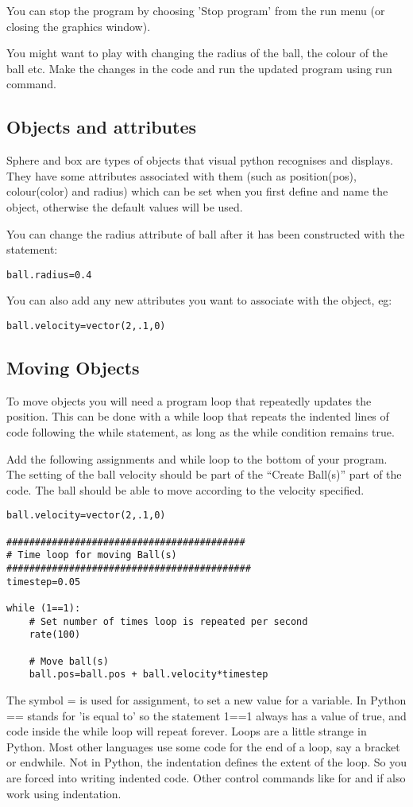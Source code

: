 \documentclass[12pt]{article}
\begin{document}
You can stop the program by choosing 'Stop program' from the run menu (or closing the graphics window).

You might want to play with changing the radius of the ball, the colour of the ball etc. Make the changes in the code and run the updated program using run command.

\subsection{Objects and attributes}
Sphere and box are types of objects that visual python recognises and displays.
They have some attributes associated with them (such as
position({\color{code}pos}), colour({\color{code}color}) and
{\color{code}radius}) which can be set when you first define and name the object,
otherwise the default values will be used.

You can change the radius attribute of {\color{code}ball} after it has been constructed
with the statement:
{\color{code}\begin{verbatim}
ball.radius=0.4
\end{verbatim}}
You can also add any new attributes you want to associate with the object, eg:
{\color{code}\begin{verbatim}
ball.velocity=vector(2,.1,0)
\end{verbatim}}

\subsection{Moving Objects}
To move objects you will need a program loop that repeatedly updates the position.
This can be done with a while loop that repeats the indented lines of code following
the while statement, as long as the while condition remains true.

Add the following assignments and while loop to the bottom of your program. The setting of the ball velocity should be part of the ``Create Ball(s)'' part of the code.  The ball should be able to move according to the velocity specified.
{\color{code}\begin{verbatim}
ball.velocity=vector(2,.1,0)

##########################################
# Time loop for moving Ball(s)
###########################################
timestep=0.05

while (1==1):
    # Set number of times loop is repeated per second
    rate(100)

    # Move ball(s)
    ball.pos=ball.pos + ball.velocity*timestep
\end{verbatim}
}
The symbol {\small\color{code}=} is used for assignment, to set a new value for a variable.
In Python {\small\color{code}==} stands for 'is equal to'
so the statement {\small\color{code}1==1} always has a value of true,
and code inside the while loop will repeat forever.
Loops are a little strange in Python. Most other languages use some
code for the end of a loop, say a bracket or {\small\color{code}endwhile}.
Not in Python, the indentation defines the extent of the loop. So you are
forced into writing indented code. Other control commands like {\small\color{code}for}
and {\small\color{code}if} also work using indentation.
\end{document}
